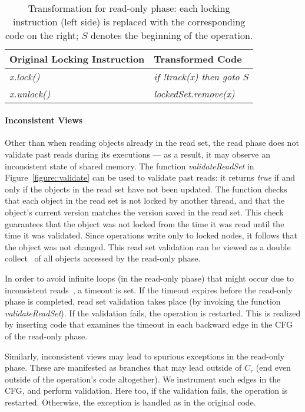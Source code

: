 \begin{table}
\scriptsize
\ttfamily
{\tt
\begin{center}
\begin{tabular}{|l|l|}
\hline
\textbf{Original Locking Instruction} & \textbf{Transformed Code}\\
\hline
\textit{x.lock()}&
\textit{if !track(x) then goto $S$}
\\
\hline
\textit{x.unlock()}&
\textit{lockedSet.remove(x)}
\\
\hline
\end{tabular}
\end{center}
}
\caption{Transformation for read-only phase:
each locking instruction (left side) is replaced with the corresponding code on the right;
 $S$  denotes the beginning of the operation.
}
\label{Ta:readOnlyTransformation}
\end{table}

\paragraph{Inconsistent Views}
Other than when reading objects already in the read set, the read phase does not validate past reads during its executions ---
as a result, it may observe an inconsistent state of shared memory.
%
The function \emph{validateReadSet} in Figure~\ref{figure::validate} can be used to validate past reads: it returns \emph{true} if and only if the objects in the read set have not been updated.
%
The function checks that each object in the read set is not locked by another thread,
and that the object's current version matches the version saved in the
read set.
This check guarantees that the object was not locked from the time it was read until
the time it was validated.
Since operations write only to
locked nodes, it follows that the object was not changed.
This read set validation can be viewed as a double collect~\cite{Afek:1993:ASS:153724.153741}
of all objects accessed by the read-only phase.

In order to avoid infinite loops (in the read-only phase) that might occur due to inconsistent reads~\cite{HLR:SLCA2010}, a timeout is set.
If the timeout expires before the read-only phase is completed, read set
validation takes place (by invoking the function \emph{validateReadSet}). If the validation fails, the operation is restarted.
This is realized by inserting code that examines the timeout in each backward edge in the CFG of the read-only phase.

Similarly, inconsistent views may lead to spurious exceptions in the read-only phase. These are manifested as branches that
may lead outside of $C_r$ (end even outside of the operation's code altogether). We instrument such edges in the CFG, and
perform validation. Here too, if the validation fails, the operation is restarted. Otherwise, the exception is handled as in
the original code.



